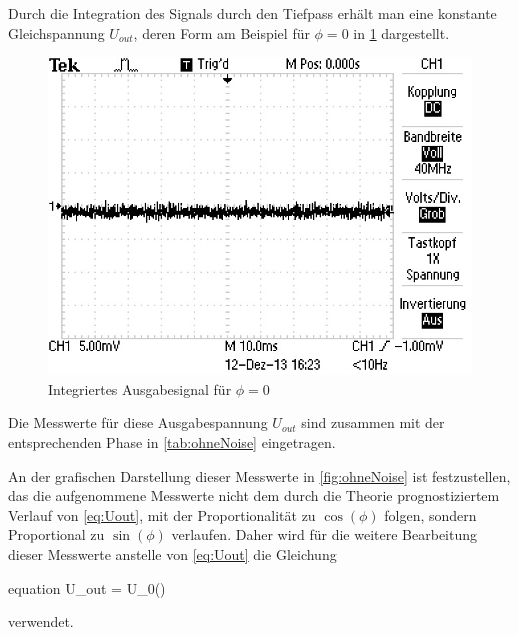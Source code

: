 	Durch die Integration des Signals durch den Tiefpass erhält man eine konstante Gleichspannung $U_{out}$,
	deren Form am Beispiel für $\phi = 0$ in \cref{fig:Uout} dargestellt.
	 
	
		\begin{figure}[!h]
			\centering
			\includegraphics[scale=0.4]{Grafiken/IntegrierteSpannung.jpg}
			\caption{Integriertes Ausgabesignal für $\phi = 0$}
			\label{fig:Uout}
		\end{figure} 
	
	Die Messwerte für diese Ausgabespannung $U_{out}$ sind zusammen mit der entsprechenden Phase in \cref{tab:ohneNoise} eingetragen. 

	
	
	An der grafischen Darstellung dieser Messwerte in \cref{fig:ohneNoise} ist festzustellen, das die aufgenommene Messwerte nicht dem
	durch die Theorie prognostiziertem Verlauf von \cref{eq:Uout}, mit der Proportionalität zu $\cos(\phi)$ folgen, sondern Proportional 
	zu $\sin(\phi)$ verlaufen. Daher wird für die weitere Bearbeitung dieser Messwerte anstelle von \cref{eq:Uout} die Gleichung 
	\begin{empheq}{equation}
			U_{out} = U_{0}\sin(\phi)
			\label{eq:Uout_sin}
	\end{empheq}     
	verwendet.   
	
